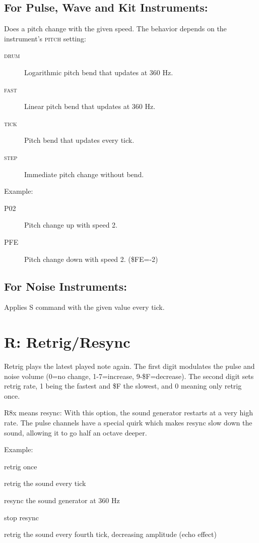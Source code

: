 \subsection{For Pulse, Wave and Kit Instruments:}

Does a pitch change with the given speed. The behavior depends on the instrument's \textsc{pitch} setting:

\begin{description}
    \item[\textsc{drum}] Logarithmic pitch bend that updates at 360 Hz.
    \item[\textsc{fast}] Linear pitch bend that updates at 360 Hz.
    \item[\textsc{tick}] Pitch bend that updates every tick.
    \item[\textsc{step}] Immediate pitch change without bend.
\end{description}

Example:

\begin{description}
\item[P02] Pitch change up with speed 2.
\item[PFE] Pitch change down with speed 2. (\$FE=-2)
\end{description}

\subsection{For Noise Instruments:}

Applies S command with the given value every tick.

\section{R: Retrig/Resync}

Retrig plays the latest played note again. The first digit modulates the pulse and noise volume (0=no change, 1-7=increase, 9-\$F=decrease). The second digit sets retrig rate, 1 being the fastest and \$F the slowest, and 0 meaning only retrig once.

R8x means resync: With this option, the sound generator restarts at a very high rate. The pulse channels have a special quirk which makes resync slow down the sound, allowing it to go half an octave deeper.

\begin{description}
\item Example:
\item[R00] retrig once
\item[R01] retrig the sound every tick
\item[R80] resync the sound generator at 360 Hz
\item[R8F] stop resync
\item[RF4] retrig the sound every fourth tick, decreasing amplitude (echo effect)
\end{description}


